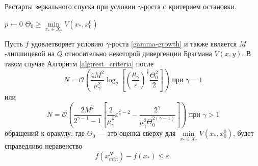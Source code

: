      \begin{algorithm}[htp]
        \caption{Рестарты зеркального спуска при условии $\gamma$-роста с критерием остановки.}
        \label{alg:rest_criteria}
        $p \gets 0$\;
        $\Theta_0 \geq \min\limits_{x_* \in X_*}{V(x_*,x_0^0)}$\;
    \end{algorithm}
    \begin{theorem}
        Пусть $f$ удовлетворяет условию $\gamma$-роста \eqref{gamma-growth} и также является $M$-липшицевой на $Q$ относительно некоторой дивергенции Брэгмана $V(x, y)$. В таком случае Алгоритм \ref{alg:rest_criteria} после 
        \begin{equation}
           N = \mathcal{O} \left( \frac{4 M^2}{\mu_{\gamma}^2} \log_2{\left[\left(\frac{\mu_{\gamma}}{\varepsilon}\right)^{\frac{2}{\gamma}} \frac{\Theta_0^2}{2}\right]}\right) \text{ при } \gamma = 1
        \end{equation}
        или
        \begin{equation}
           N = \mathcal{O}\left( \frac{2 M^2 }{2^{\gamma - 1} - 1}\left[ \frac{2}{\mu_{\gamma}^{\frac{2}{\gamma}}}\varepsilon^{\frac{2}{\gamma} - 2} - \frac{2^{\gamma}}{\mu_{\gamma}^2 \Theta_0^{2(\gamma - 1)}} \right] \right) \text{ при } \gamma > 1
        \end{equation}
        обращений к оракулу, где $\Theta_0$ --- это оценка сверху для $\min\limits_{x_* \in X_*}{V(x_*, x_0^0)}$, будет справедливо неравенство
        \begin{equation}
            f(x_{min}^N) - f(x_*) \leq \varepsilon.
        \end{equation}
    \end{theorem}


